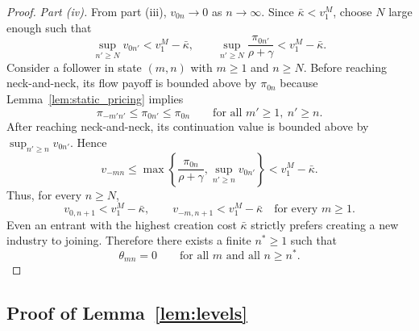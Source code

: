 \documentclass[12pt]{article}
\begin{document}
\begin{proof}
\noindent\textit{Part (iv).}
From part (iii), \(v_{0n}\to 0\) as \(n\to\infty\). Since \(\bar{\kappa}<v^M_1\), choose
\(N\) large enough such that
\[
\sup_{n'\geq N}v_{0n'}<v^M_1-\bar{\kappa},
\qquad
\sup_{n'\geq N}\frac{\pi_{0n'}}{\rho+\gamma}<v^M_1-\bar{\kappa}.
\]
Consider a follower in state \((m,n)\) with \(m\geq1\) and \(n\geq N\). Before reaching neck-and-neck, its flow payoff is bounded above by \(\pi_{0n}\) because Lemma~\ref{lem:static_pricing} implies
\[
\pi_{-m'n'}\leq \pi_{0n'}\leq \pi_{0n}
\qquad\text{for all }m'\geq1,\ n'\geq n.
\]
After reaching neck-and-neck, its continuation value is bounded above by \(\sup_{n'\geq n}v_{0n'}\). Hence
\[
v_{-mn}
\leq
\max\left\{
\frac{\pi_{0n}}{\rho+\gamma},
\sup_{n'\geq n}v_{0n'}
\right\}
<
v^M_1-\bar{\kappa}.
\]
Thus, for every \(n\geq N\),
\[
v_{0,n+1}<v^M_1-\bar{\kappa},
\qquad
v_{-m,n+1}<v^M_1-\bar{\kappa}
\quad\text{for every }m\geq1.
\]
Even an entrant with the highest creation cost \(\bar{\kappa}\) strictly prefers creating
a new industry to joining. Therefore there exists a finite \(n^\ast\geq 1\) such that
\[
\theta_{mn}=0
\qquad
\text{for all }m\text{ and all }n\geq n^\ast.
\]
\end{proof}

\subsection{Proof of Lemma~\ref{lem:levels}}
\end{document}
